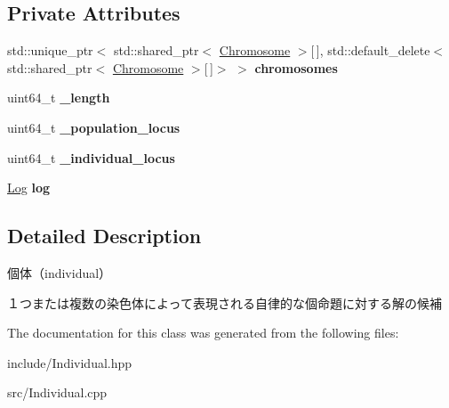 \subsection*{Private Attributes}
\begin{DoxyCompactItemize}
\item 
\mbox{\label{class_g_a_1_1_individual_a183dbace348505f41e542030d25992ee}} 
std\+::unique\+\_\+ptr$<$ std\+::shared\+\_\+ptr$<$ \mbox{\hyperlink{class_g_a_1_1_chromosome}{Chromosome}} $>$\mbox{[}$\,$\mbox{]}, std\+::default\+\_\+delete$<$ std\+::shared\+\_\+ptr$<$ \mbox{\hyperlink{class_g_a_1_1_chromosome}{Chromosome}} $>$\mbox{[}$\,$\mbox{]}$>$ $>$ {\bfseries chromosomes}
\item 
\mbox{\label{class_g_a_1_1_individual_a699a3f9f0aefcd4c0503b8190223ddcb}} 
uint64\+\_\+t {\bfseries \+\_\+length}
\item 
\mbox{\label{class_g_a_1_1_individual_a00bf2a027858f02daec180eba5edf464}} 
uint64\+\_\+t {\bfseries \+\_\+population\+\_\+locus}
\item 
\mbox{\label{class_g_a_1_1_individual_a8c5bddcd8de924efa1094651e095dbac}} 
uint64\+\_\+t {\bfseries \+\_\+individual\+\_\+locus}
\item 
\mbox{\label{class_g_a_1_1_individual_a0f9b85d7584e7edfce280fdec7abf616}} 
\mbox{\hyperlink{class_g_a_1_1_log}{Log}} {\bfseries log}
\end{DoxyCompactItemize}


\subsection{Detailed Description}
個体（individual） 

１つまたは複数の染色体によって表現される自律的な個命題に対する解の候補 

The documentation for this class was generated from the following files\+:\begin{DoxyCompactItemize}
\item 
include/Individual.\+hpp\item 
src/Individual.\+cpp\end{DoxyCompactItemize}
